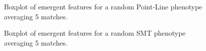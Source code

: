 \documentclass{Configuration_Files/PoliMi3i_thesis}
\begin{document}
\begin{figure}[p]
    \caption{Boxplot of emergent features for a random Point-Line phenotype averaging 5 matches.}
    \label{fig:emergent_features_noisiness_5_pointad}
\end{figure}
\begin{figure}[H]
    \caption{Boxplot of emergent features for a random SMT phenotype averaging 5 matches.}
    \label{fig:emergent_features_noisiness_5_smt}
\end{figure}
\end{document}
